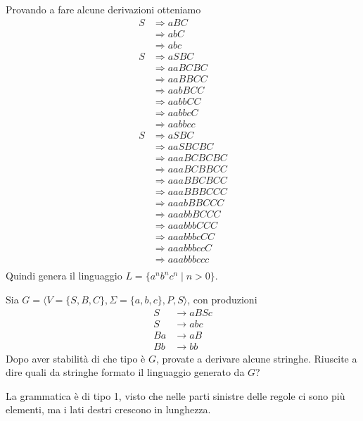 \documentclass[12pt, answers]{exam}
\begin{document}
\begin{questions}
\begin{solution}
		Provando a fare alcune derivazioni otteniamo
		\begin{align*}
			S &\Rightarrow a B C \\
			  &\Rightarrow a b C \\
			  &\Rightarrow a b c \\
			S &\Rightarrow a S B C \\
			  &\Rightarrow a a B C B C \\
			  &\Rightarrow a a B B C C \\
			  &\Rightarrow a a b B C C \\
			  &\Rightarrow a a b b C C \\
			  &\Rightarrow a a b b c C \\
			  &\Rightarrow a a b b c c \\
			S &\Rightarrow a S B C \\
			  &\Rightarrow a a S B C B C \\
			  &\Rightarrow a a a B C B C B C \\
			  &\Rightarrow a a a B C B B C C \\
			  &\Rightarrow a a a B B C B C C \\
			  &\Rightarrow a a a B B B C C C \\
			  &\Rightarrow a a a b B B C C C \\
			  &\Rightarrow a a a b b B C C C \\
			  &\Rightarrow a a a b b b C C C \\
			  &\Rightarrow a a a b b b c C C \\
			  &\Rightarrow a a a b b b c c C \\
			  &\Rightarrow a a a b b b c c c \\
		\end{align*}
		Quindi genera il linguaggio $L = \{ a^nb^nc^n \mid n > 0 \}$.
	\end{solution}
	\question Sia $G = \langle V = \{ S, B, C\}, \Sigma = \{ a , b, c\}, P, S\rangle$, con produzioni
	\begin{align}
		S &\rightarrow a B S c \\
		S &\rightarrow a b c \\
		B a &\rightarrow a B \\
		B b &\rightarrow b b
	\end{align}
	Dopo aver stabilità di che tipo è $G$, provate a derivare alcune stringhe.
	Riuscite a dire quali da stringhe formato il linguaggio generato da $G$?
	\begin{solution}
		La grammatica è di tipo 1, visto che nelle parti sinistre delle regole ci sono più elementi, ma i lati destri crescono in lunghezza.


\end{solution}
\end{questions}
\end{document}

